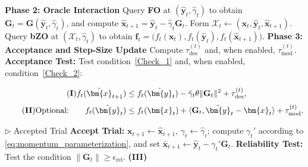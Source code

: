 \documentclass{article}
\begin{document}
\begin{algorithm}[t]
\begin{algorithmic}[1]
        \State \textbf{Phase 2: Oracle Interaction}
        \State Query \textbf{\textbf{FO}} at
        \((\hat {\bm{y}}_t,\hat\gamma_t)\) to obtain
        \(\mathbf{G}_t=\mathbf{G}(\hat {\bm{y}}_t,\hat\gamma_t)\), and compute
        \(\hat {\bm{x}}_{t+1}=\hat {\bm{y}}_t-\hat\gamma_t\mathbf{G}_t\).
        \State Form
        \(\mathcal X_t\gets(\bm{x}_t,\hat {\bm{y}}_t,\hat {\bm{x}}_{t+1})\).
        \State Query \textbf{\textbf{bZO}} at
        \((\mathcal X_t,\hat\gamma_t)\) to obtain
        \(\mathbf{f}_t=
        \bigl(f_t(\bm{x}_t),f_t(\hat {\bm{y}}_t),f_t(\hat {\bm{x}}_{t+1})\bigr)\).
        \vspace{0.1cm}
        \State \textbf{Phase 3: Acceptance and Step-Size Update}
        \State Compute \(\tau_{\mathrm{des}}^{(t)}\) and, when enabled,
        \(\tau_{\mathrm{mod}}^{(t)}\).
        \State \textbf{Acceptance Test:} Test condition~\eqref{Check_1}
        and, when enabled, condition~\eqref{Check_2}:
        \Statex \hspace{\algorithmicindent}%
        \begin{minipage}{0.94\linewidth}
        \begin{align}
            \tag{\textbf{I}}
            f_t(\hat {\bm{x}}_{t+1})
            &\le
            f_t(\hat {\bm{y}}_t)
            -\hat\gamma_t\theta\|\mathbf{G}_t\|^2
            +\tau_{\mathrm{des}}^{(t)},
            \label{Check_1}
            \\[1mm]
            \tag{\textbf{II}}
            \textnormal{Optional:}\qquad
            f_t(\hat {\bm{y}}_t)
            &\le
            f_t(\bm{x}_t)
            +\langle\mathbf{G}_t,\hat {\bm{y}}_t-\bm{x}_t\rangle
            +\tau_{\mathrm{mod}}^{(t)}.
            \label{Check_2}
        \end{align}
        \end{minipage}

        \hfill {\footnotesize $\triangleright$ Accepted Trial}
            \State \textbf{Accept Trial:}
            \(\bm{x}_{t+1}\gets\hat {\bm{x}}_{t+1}\),
            \(\gamma_t\gets\hat\gamma_t\); compute \(\gamma_t'\) according to
            \eqref{eq:momentum_parameterization}, and set
            \(\bar {\bm{x}}_{t+1}\gets\hat {\bm{y}}_t-\gamma_t'\mathbf{G}_t\).
\textbf{Reliability Test:}
Test the condition \(\|\mathbf{G}_t\|\ge\epsilon_{\mathrm{rel}}\).
\hfill\textup{\textbf{(III)}}%
\hspace*{\dimexpr0.06\linewidth-\algorithmicindent\relax}


\end{algorithmic}
\end{algorithm}
\end{document}

